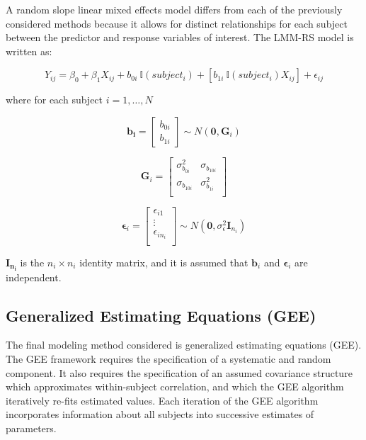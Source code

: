 \documentclass[12pt,]{article}
\begin{document}
A random slope linear mixed effects model differs from each of the
previously considered methods because it allows for distinct
relationships for each subject between the predictor and response
variables of interest. The LMM-RS model is written as:

\[Y_{ij} = \beta_{0} + \beta_{1} X_{ij} + b_{0i} \ \mathbb{I}\left(subject_{i}\right) + \left [ b_{1i} \ \mathbb{I}\left(subject_{i}\right)  X_{ij}   \right ] + \epsilon_{ij}\]

where for each subject \(i=1,\ldots,N\)

\[\mathbf{b_{i}} = 
\begin{bmatrix}
b_{0i} \\
b_{1i}
\end{bmatrix} \sim 
N \left(\mathbf{0}, \mathbf{G}_i \right)\]

\[\mathbf{G}_i=\begin{bmatrix}
\sigma_{b_{0i}}^2 & \sigma_{b_{10i}} \\
\sigma_{b_{10i}} & \sigma_{b_{1i}}^{2}\\
\end{bmatrix}\]

\[\bm{ \epsilon }_{i} = 
\begin{bmatrix}
\epsilon_{i1}\\
\vdots \\
\epsilon_{in_{i}}\\
\end{bmatrix}
\sim N\left(\mathbf{0}, \sigma_{\epsilon}^{2}\mathbf{I}_{n_{i}} \right) \]

\(\mathbf{I_{n_{i}}}\) is the \(n_{i} \times n_{i}\) identity matrix,
and it is assumed that \(\mathbf{b}_{i}\) and \(\bm{\epsilon}_{i}\) are
independent.

\hypertarget{generalized-estimating-equations-gee}{%
\subsection{Generalized Estimating Equations
(GEE)}\label{generalized-estimating-equations-gee}}

The final modeling method considered is generalized estimating equations
(GEE). The GEE framework requires the specification of a systematic and
random component. It also requires the specification of an assumed
covariance structure which approximates within-subject correlation, and
which the GEE algorithm iteratively re-fits estimated values. Each
iteration of the GEE algorithm incorporates information about all
subjects into successive estimates of parameters.
\end{document}
